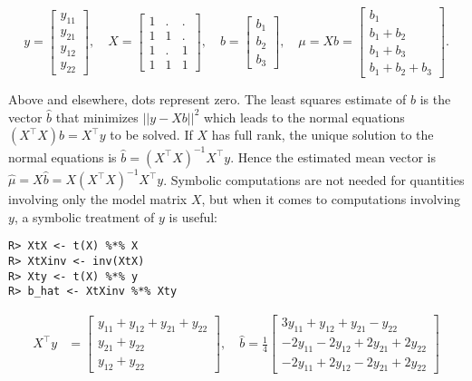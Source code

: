 \[
y = \left[\begin{matrix}y_{11}\\y_{21}\\y_{12}\\y_{22}\end{matrix}\right], \quad X=\left[\begin{matrix}1 & . & .\\1 & 1 & .\\1 & . & 1\\1 & 1 & 1\end{matrix}\right], \quad b=\left[\begin{matrix}b_{1}\\b_{2}\\b_{3}\end{matrix}\right], \quad  \mu = X b = \left[\begin{matrix}b_{1}\\b_{1} + b_{2}\\b_{1} + b_{3}\\b_{1} + b_{2} + b_{3}\end{matrix}\right] .
\]

Above and elsewhere, dots represent zero.
The least squares estimate of \(b\) is the vector \(\hat{b}\) that minimizes \(||y-X b||^2\) which leads to the normal equations \((X^\top X)b = X^\top y\) to be solved. If \(X\) has full rank, the unique solution to the normal
equations is \(\hat{b} = (X^\top X)^{-1} X^\top y\). Hence the
estimated mean vector is \(\hat \mu = X\hat{b}=X(X^\top X)^{-1} X^\top y\). Symbolic computations are
not needed for quantities involving only the model matrix \(X\), but
when it comes to computations involving \(y\), a symbolic treatment of
\(y\) is useful:

\begin{verbatim}
R> XtX <- t(X) %*% X
R> XtXinv <- inv(XtX)
R> Xty <- t(X) %*% y
R> b_hat <- XtXinv %*% Xty
\end{verbatim}

\begin{align}
X^\top y &= \left[\begin{matrix}y_{11} + y_{12} + y_{21} + y_{22}\\y_{21} + y_{22}\\y_{12} + y_{22}\end{matrix}\right] , 
\quad
\hat{b} = \frac{1}{4}  \left[\begin{matrix}3 y_{11} + y_{12} + y_{21} - y_{22}\\- 2 y_{11} - 2 y_{12} + 2 y_{21} + 2 y_{22}\\- 2 y_{11} + 2 y_{12} - 2 y_{21} + 2 y_{22}\end{matrix}\right]
\end{align}

